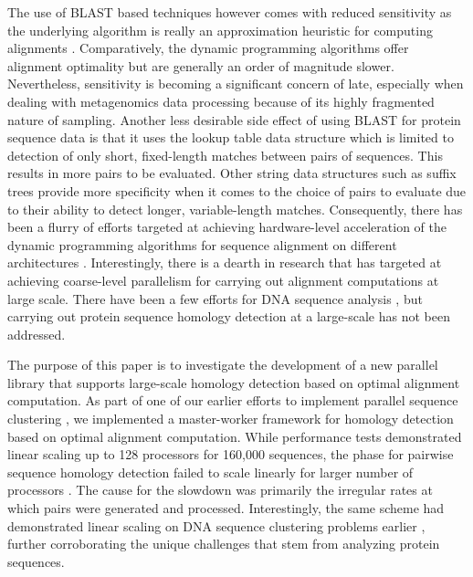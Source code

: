 \documentclass[10pt,journal,letterpaper,compsoc]{IEEEtran}
\begin{document}
The use of BLAST based techniques however comes with reduced sensitivity as the underlying algorithm is really an approximation heuristic for computing alignments \cite{Pearson91,Shpaer96}. Comparatively, the dynamic programming algorithms offer alignment optimality but are generally an order of magnitude slower. Nevertheless, sensitivity is becoming a significant concern of late, especially when dealing with metagenomics data processing because of its highly fragmented nature of sampling. Another less desirable side effect of using BLAST for protein sequence data is that it uses the lookup table data structure which is limited to detection of only short, fixed-length matches between pairs of sequences. This results in more pairs to be evaluated. Other string data structures such as suffix trees provide more specificity when it comes to the choice of pairs to evaluate due to their ability to detect longer, variable-length matches. Consequently, there has been a flurry of efforts targeted at achieving hardware-level acceleration of the dynamic programming algorithms for sequence alignment on different architectures \cite{Majumder10}. Interestingly, there is a dearth in research that has targeted at achieving coarse-level parallelism for carrying out alignment computations at large scale. There have been a few efforts for DNA sequence analysis \cite{KalyanaramanTPDS03,KalyanaramanJPDC07}, but carrying out protein sequence homology detection at a large-scale has not been addressed.



The purpose of this paper is to investigate the development of a new parallel library that supports large-scale homology detection based on optimal alignment computation. As part of one of our earlier efforts to implement parallel sequence clustering \cite{Wu08}, we implemented a master-worker framework for homology detection based on optimal alignment computation. While performance tests demonstrated linear scaling up to 128 processors for 160,000 sequences, the phase for pairwise sequence homology detection failed to scale linearly for larger number of processors \cite{Wu08}. The cause for the slowdown was primarily the irregular rates at which pairs were generated and processed. Interestingly, the same scheme had demonstrated linear scaling on DNA sequence clustering problems earlier \cite{KalyanaramanJPDC07}, further corroborating the unique challenges that stem from analyzing protein sequences.
\end{document}
